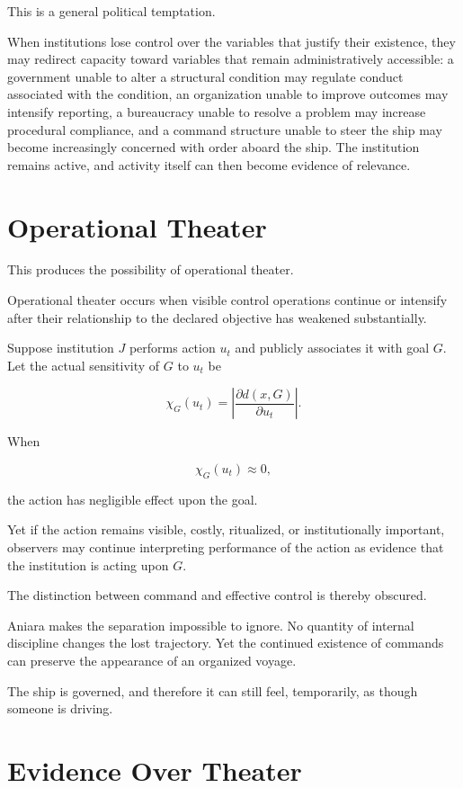 \documentclass[11pt,oneside]{book}
\theoremstyle{definition}
\theoremstyle{remark}
\begin{document}
This is a general political temptation.

When institutions lose control over the variables that justify their existence, they may redirect capacity toward variables that remain administratively accessible: a government unable to alter a structural condition may regulate conduct associated with the condition, an organization unable to improve outcomes may intensify reporting, a bureaucracy unable to resolve a problem may increase procedural compliance, and a command structure unable to steer the ship may become increasingly concerned with order aboard the ship. The institution remains active, and activity itself can then become evidence of relevance.

\section{Operational Theater}

This produces the possibility of operational theater.

Operational theater occurs when visible control operations continue or intensify after their relationship to the declared objective has weakened substantially.

Suppose institution \(J\) performs action \(u_t\) and publicly associates it with goal \(G\). Let the actual sensitivity of \(G\) to \(u_t\) be

\[
\chi_G(u_t)
=
\left|
\frac{\partial d(x,G)}
{\partial u_t}
\right|.
\]

When

\[
\chi_G(u_t)\approx0,
\]

the action has negligible effect upon the goal.

Yet if the action remains visible, costly, ritualized, or institutionally important, observers may continue interpreting performance of the action as evidence that the institution is acting upon \(G\).

The distinction between command and effective control is thereby obscured.

Aniara makes the separation impossible to ignore. No quantity of internal discipline changes the lost trajectory. Yet the continued existence of commands can preserve the appearance of an organized voyage.

The ship is governed, and therefore it can still feel, temporarily, as though someone is driving.

\section{Evidence Over Theater}
\end{document}
